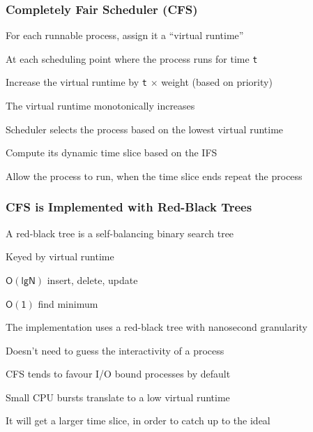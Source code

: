   \begin{frame}
    \frametitle{Completely Fair Scheduler (CFS)}

    For each runnable process, assign it a ``virtual runtime''

    \hspace{2em} At each scheduling point where the process runs for time \texttt{t}

    \hspace{4em} Increase the virtual runtime by \texttt{t} $\mathsf{\times}$ weight (based on priority)

    \vspace{2em}

    The virtual runtime monotonically increases

    \hspace{2em} Scheduler selects the process based on the lowest virtual runtime

    \hspace{4em} Compute its dynamic time slice based on the IFS

    \vspace{2em}

    Allow the process to run, when the time slice ends repeat the process
  \end{frame}

  \begin{frame}
    \frametitle{CFS is Implemented with Red-Black Trees}

    A red-black tree is a self-balancing binary search tree

    \hspace{2em} Keyed by virtual runtime

    \hspace{4em} $\mathsf{O(lg N)}$ insert, delete, update

    \hspace{4em} $\mathsf{O(1)}$ find minimum

    \vspace{2em}

    The implementation uses a red-black tree with nanosecond granularity

    \hspace{2em} Doesn't need to guess the interactivity of a process

    \vspace{2em}

    CFS tends to favour I/O bound processes by default

    \hspace{2em} Small CPU bursts translate to a low virtual runtime

    \hspace{4em} It will get a larger time slice, in order to catch up to the ideal
  \end{frame}

